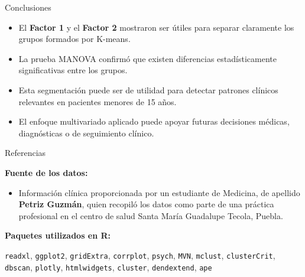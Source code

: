 \documentclass[
	11pt, %
]{beamer}
\begin{document}
\begin{frame}{Conclusiones}

\begin{itemize}
    \item El \textbf{Factor 1} y el \textbf{Factor 2} mostraron ser útiles para separar claramente los grupos formados por K-means.

    \item La prueba MANOVA confirmó que existen diferencias estadísticamente significativas entre los grupos.

    \item Esta segmentación puede ser de utilidad para detectar patrones clínicos relevantes en pacientes menores de 15 años.

    \item El enfoque multivariado aplicado puede apoyar futuras decisiones médicas, diagnósticas o de seguimiento clínico.
\end{itemize}

\end{frame}



\begin{frame}{Referencias}

\textbf{Fuente de los datos:}
\begin{itemize}
    \item Información clínica proporcionada por un estudiante de Medicina, de apellido \textbf{Petriz Guzmán}, quien recopiló los datos como parte de una práctica profesional en el centro de salud Santa María Guadalupe Tecola, Puebla.
\end{itemize}

\vspace{0.5cm}

\textbf{Paquetes utilizados en R:}

\smallskip

\texttt{readxl}, \texttt{ggplot2}, \texttt{gridExtra}, \texttt{corrplot}, \texttt{psych}, \texttt{MVN}, \texttt{mclust}, \texttt{clusterCrit}, \texttt{dbscan}, \texttt{plotly}, \texttt{htmlwidgets}, \texttt{cluster}, \texttt{dendextend}, \texttt{ape}

\end{frame}
\end{document}
